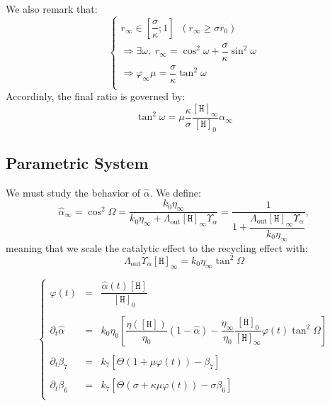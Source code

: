\documentclass[aps,onecolumn,11pt]{revtex4}
\newcommand{\mychem}[1]{\mathtt{#1}}
\newcommand{\myconc}[1]{\left\lbrack{#1}\right\rbrack}
\newcommand{\spproton}{\mychem{H}}
\newcommand{\proton}{\myconc{\spproton}}
\newcommand{\LiAll}{\Lambda}
\newcommand{\LiAllOut}{{\LiAll}_{\mathrm{out}}}
\begin{document}
We also remark that:
\begin{equation}
\left\lbrace
\begin{array}{l}
	r_\infty  \in  \left[\dfrac{\sigma}{\kappa};1\right] \;\; \left(r_\infty \geq \sigma r_0 \right)\\
	 \Rightarrow  \exists \omega,\; r_\infty = \cos^2\omega + \dfrac{\sigma}{\kappa} \sin^2 \omega\\
	 \Rightarrow  \varphi_\infty \mu = \dfrac{\sigma}{\kappa} \tan^2\omega\\
\end{array}
\right.
\end{equation}
Accordinly, the final ratio is governed by:
\begin{equation}
	\tan^2 \omega = \mu \dfrac{\kappa}{\sigma} \dfrac{\proton_\infty}{\proton_0} \alpha_\infty
\end{equation}


\subsection{Parametric System}
We must study the behavior of $\hat\alpha$.
We define:
\begin{equation}
	\hat\alpha_\infty = \cos^2\Omega = \dfrac{k_0\eta_\infty}{k_0\eta_\infty+\LiAllOut \proton_\infty \Upsilon_\alpha}
	= \dfrac{1}{1+\dfrac{\LiAllOut \proton_\infty \Upsilon_\alpha}{k_0\eta_\infty}},
\end{equation}
meaning that we scale the catalytic effect to the recycling effect with:
\begin{equation}
	\LiAllOut \Upsilon_\alpha \proton_\infty = {k_0\eta_\infty} \tan^2\Omega
\end{equation}

\begin{equation}
\left\lbrace
\begin{array}{rcl}
	 \varphi(t) & = & \dfrac{\hat\alpha(t) \proton}{\proton_0}\\
	 \\
	 \partial_t \hat\alpha & = &
	 k_0 \eta_0 \left[ \dfrac{\eta( \proton )}{\eta_0} \left(1-\hat\alpha\right) 
	 - \dfrac{\eta_\infty}{\eta_0} \dfrac{\proton_0}{\proton_\infty} \varphi(t) \tan^2\Omega\right]   \\
	 \\
	\partial_t \beta_7 & = & k_7 \left[ \Theta \left( 1 + \mu \varphi(t) \right) - \beta_7 \right] \\
	\\
	\partial_t \beta_6 & = & k_7 \left[ \Theta \left( \sigma + \kappa \mu \varphi(t) \right) - \sigma \beta_6 \right] \\
\end{array}
\right.
\end{equation}
\end{document}
